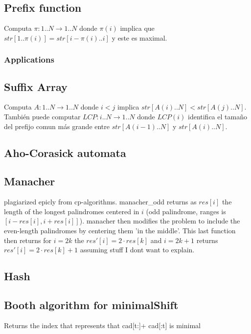\documentclass[landscape, 9pt, a4paper, oneside, twocolumn]{extarticle}
\begin{document}
	\subsection{Prefix function}
	Computa \(\pi : 1..N\to 1..N\) donde \(\pi(i)\) implica que \(str[1..\pi(i)]=str[i-\pi(i)..i]\) y este es maximal.
	
	
	\subsubsection{Applications}
	


	\subsection{Suffix Array}
	Computa \(A : 1..N\to 1..N\) donde \(i<j\) implica \(str[A(i)..N]<str[A(j)..N]\).
	También puede computar \(LCP : i..N\to 1..N\) donde \(LCP(i)\) identifica el tamaño del prefijo comun más grande entre \(str[A(i-1)..N]\) y \(str[A(i)..N]\).

	
	
	\subsection{Aho-Corasick automata}
	
	
	\subsection{Manacher}
	plagiarized epicly from cp-algorithms. manacher\_odd returns as $res[i]$ the length of the longest palindromes centered in $i$ (odd palindrome, ranges is $[i-res[i],i+res[i]]$). manacher then modifies the problem to include the even-length palindromes by centering them 'in the middle'. This last function then returns for $i=2k$ the $res'[i]=2\cdot res[k]$ and $i=2k+1$ returns $res'[i]=2\cdot res[k]+1$ assuming stuff I dont want to explain.
	
	
	\subsection{Hash}
	
	
	\subsection{Booth algorithm for minimalShift}
	Returns the index that represents that cad[t:]+ cad[:t] is minimal
	
\end{document}
